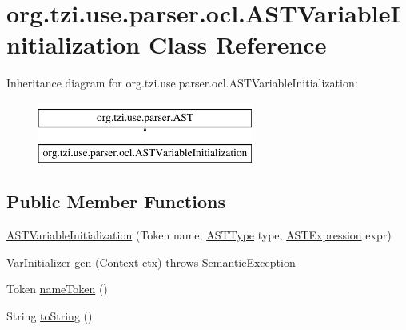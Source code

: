 \hypertarget{classorg_1_1tzi_1_1use_1_1parser_1_1ocl_1_1_a_s_t_variable_initialization}{\section{org.\-tzi.\-use.\-parser.\-ocl.\-A\-S\-T\-Variable\-Initialization Class Reference}
\label{classorg_1_1tzi_1_1use_1_1parser_1_1ocl_1_1_a_s_t_variable_initialization}
}
Inheritance diagram for org.\-tzi.\-use.\-parser.\-ocl.\-A\-S\-T\-Variable\-Initialization\-:\begin{figure}[H]
\begin{center}
\leavevmode
\includegraphics[height=2.000000cm]{classorg_1_1tzi_1_1use_1_1parser_1_1ocl_1_1_a_s_t_variable_initialization}
\end{center}
\end{figure}
\subsection*{Public Member Functions}
\begin{DoxyCompactItemize}
\item 
\hyperlink{classorg_1_1tzi_1_1use_1_1parser_1_1ocl_1_1_a_s_t_variable_initialization_a832e7b662e6a5367c43cb5d11dffd5fa}{A\-S\-T\-Variable\-Initialization} (Token name, \hyperlink{classorg_1_1tzi_1_1use_1_1parser_1_1ocl_1_1_a_s_t_type}{A\-S\-T\-Type} type, \hyperlink{classorg_1_1tzi_1_1use_1_1parser_1_1ocl_1_1_a_s_t_expression}{A\-S\-T\-Expression} expr)
\item 
\hyperlink{classorg_1_1tzi_1_1use_1_1uml_1_1ocl_1_1expr_1_1_var_initializer}{Var\-Initializer} \hyperlink{classorg_1_1tzi_1_1use_1_1parser_1_1ocl_1_1_a_s_t_variable_initialization_a821a4bcea93ae1620093516a99c87ae0}{gen} (\hyperlink{classorg_1_1tzi_1_1use_1_1parser_1_1_context}{Context} ctx)  throws Semantic\-Exception 
\item 
Token \hyperlink{classorg_1_1tzi_1_1use_1_1parser_1_1ocl_1_1_a_s_t_variable_initialization_a4123b62c3be1cbd3b1669cf804467f7c}{name\-Token} ()
\item 
String \hyperlink{classorg_1_1tzi_1_1use_1_1parser_1_1ocl_1_1_a_s_t_variable_initialization_ac936df75b5e07bc04b5852b9635f2e23}{to\-String} ()
\end{DoxyCompactItemize}


